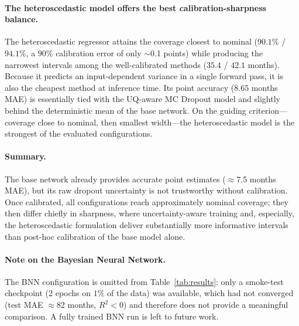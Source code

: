 \paragraph{The heteroscedastic model offers the best calibration-sharpness
balance.} The heteroscedastic regressor attains the coverage closest to nominal
($90.1\%$ / $94.1\%$, a $90\%$ calibration error of only $\sim$0.1 points) while
producing the narrowest intervals among the well-calibrated methods ($35.4$ /
$42.1$ months). Because it predicts an input-dependent variance in a single
forward pass, it is also the cheapest method at inference time. Its point
accuracy ($8.65$ months MAE) is essentially tied with the UQ-aware MC Dropout
model and slightly behind the deterministic mean of the base network. On the
guiding criterion---coverage close to nominal, then smallest width---the
heteroscedastic model is the strongest of the evaluated configurations.

\paragraph{Summary.} The base network already provides accurate point estimates
($\approx$7.5 months MAE), but its raw dropout uncertainty is not trustworthy
without calibration. Once calibrated, all configurations reach approximately
nominal coverage; they then differ chiefly in sharpness, where uncertainty-aware
training and, especially, the heteroscedastic formulation deliver substantially
more informative intervals than post-hoc calibration of the base model alone.

\paragraph{Note on the Bayesian Neural Network.} The BNN configuration is
omitted from Table~\ref{tab:results}: only a smoke-test checkpoint (2 epochs on
$1\%$ of the data) was available, which had not converged (test MAE $\approx 82$
months, $R^2 < 0$) and therefore does not provide a meaningful comparison. A
fully trained BNN run is left to future work.


